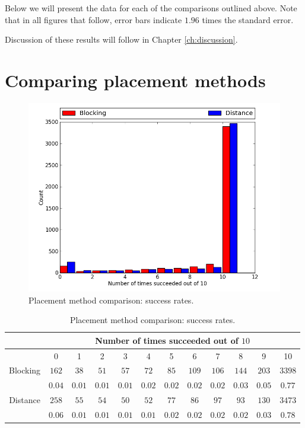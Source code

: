 Below we will present the data for each of the comparisons outlined above. Note
that in all figures that follow, error bars indicate $1.96$ times the
standard error.

Discussion of these results will follow in Chapter \ref{ch:discussion}.

\section{Comparing placement methods}
\label{sec:compare_placement}

\begin{figure}[H]
\begin{center}
\includegraphics[width=\textwidth]{Images/placement_success_comparison.png}
\caption{Placement method comparison: success rates.}
\label{fig:placement_success}
\end{center}
\end{figure}

\begin{table}[H]
\begin{center}
\begin{singlespace}
\begin{tabular}{|c||c|c|c|c|c|c|c|c|c|c|c|}
\hline
 & \multicolumn{11}{|c|}{Number of times succeeded out of $10$} \\
\hline
 & 0 & 1 & 2 & 3 & 4 & 5 & 6 & 7 & 8 & 9 & 10 \\
\hline\hline
Blocking & $162$ & $38$ & $51$ & $57$ & $72$ & $85$ & $109$ & $106$ & $144$ & $203$ & $3398$ \\
 & $0.04$ & $0.01$ & $0.01$ & $0.01$ & $0.02$ & $0.02$ & $0.02$ & $0.02$ & $0.03$ & $0.05$ & $0.77$ \\
\hline
 Distance & $258$ & $55$ & $54$ & $50$ & $52$ & $77$ & $86$ & $97$ & $93$ & $130$ & $3473$ \\
  & $0.06$ & $0.01$ & $0.01$ & $0.01$ & $0.01$ & $0.02$ & $0.02$ & $0.02$ & $0.02$ & $0.03$ & $0.78$ \\
\hline
\end{tabular}
\end{singlespace}
\end{center}
\label{tb:placement_success}
\caption{Placement method comparison: success rates.}
\end{table}

